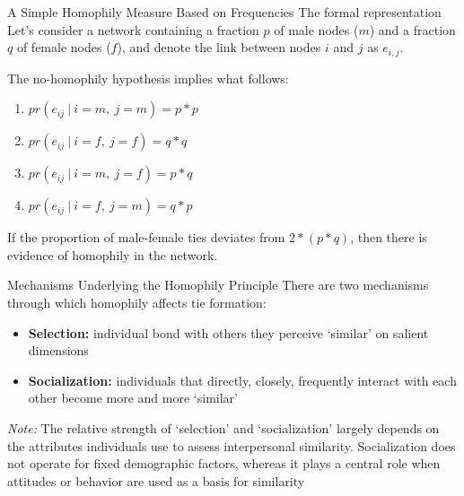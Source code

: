 \documentclass[notes, aspectratio=1610]{beamer}
\begin{document}
\begin{frame}{A Simple Homophily Measure Based on Frequencies}
	{The formal representation}
	Let's consider a network containing a fraction $p$ of male nodes ($m$) 
	and a fraction $q$ of female nodes ($f$), and denote the link between 
	nodes $i$ and $j$ as $e_{i,j}$.

	\vspace{2em}
	
	The no-homophily hypothesis implies what follows:
	\begin{enumerate}
	\item $pr(e_{ij} \ | \ i = m, \ j = m) = p * p$
	\item $pr(e_{ij} \ | \ i = f, \ j = f) = q * q$
	\item $pr(e_{ij} \ | \ i = m, \ j = f) = p * q$
	\item $pr(e_{ij} \ | \ i = f, \ j = m) = q * p$
	\end{enumerate}

	\vspace{2em}

	If the proportion of male-female ties deviates from $2*(p*q)$, then there is evidence of homophily in the network.

\end{frame}

\begin{frame}{Mechanisms Underlying the Homophily Principle}{}
	There are two mechanisms through which homophily affects tie formation:
	
	\begin{itemize}
	\item \textbf{Selection:} individual bond with others they perceive `similar' on 
	salient dimensions
	\item \textbf{Socialization:} individuals that directly, closely, frequently 
	interact with each other become more and more `similar'
	\end{itemize}

	\vspace{1em}

\small \textit{Note:} The relative strength of `selection' and `socialization' largely 
depends on the attributes individuals use to assess interpersonal similarity. 
Socialization does not operate for fixed demographic factors, whereas it 
plays a central role when attitudes or behavior are used as a basis for similarity 
\end{frame}
\end{document}
